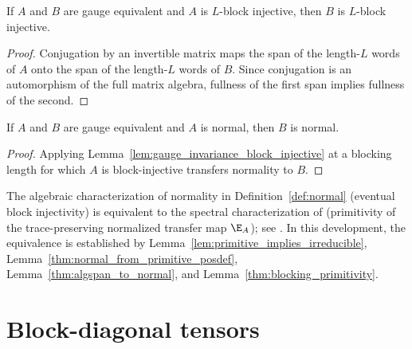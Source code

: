 \begin{lemma}
    \label{lem:gauge_invariance_block_injective}
    \leanok
    If $A$ and $B$ are gauge equivalent and $A$ is $L$-block injective, then
    $B$ is $L$-block injective.
\end{lemma}

\begin{proof}\leanok
    Conjugation by an invertible matrix maps the span of the length-$L$ words
    of $A$ onto the span of the length-$L$ words of $B$. Since conjugation is
    an automorphism of the full matrix algebra, fullness of the first span
    implies fullness of the second.
\end{proof}

\begin{lemma}
    \label{thm:gauge_invariance_normal}
    \leanok
    If $A$ and $B$ are gauge equivalent and $A$ is normal, then $B$ is normal.
\end{lemma}

\begin{proof}\leanok
    Applying Lemma~\ref{lem:gauge_invariance_block_injective} at a blocking
    length for which $A$ is block-injective transfers normality to $B$.
\end{proof}

\begin{remark}\leanok
    The algebraic characterization of normality in
    Definition~\ref{def:normal} (eventual block injectivity) is equivalent to
    the spectral characterization of \cite[Definition~IV.1]{Cirac2021Matrix}
    (primitivity of the trace-preserving normalized transfer map $\E_A$); see
    \cite[Proposition~3]{Sanz2010Quantum}. In this development, the equivalence
    is established by Lemma~\ref{lem:primitive_implies_irreducible},
    Lemma~\ref{thm:normal_from_primitive_posdef},
    Lemma~\ref{thm:algspan_to_normal}, and
    Lemma~\ref{thm:blocking_primitivity}.
\end{remark}

\section{Block-diagonal tensors}

